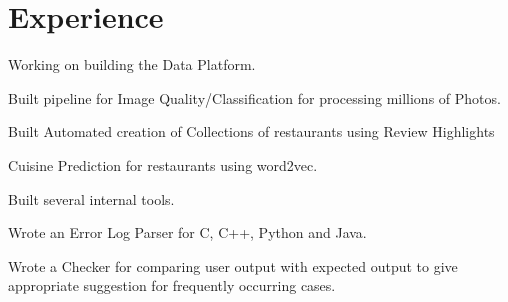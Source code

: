 \documentclass[]{deedy-resume-openfont}
\begin{document}
\begin{minipage}[t]{0.66\textwidth} 


\section{Experience}



\vspace{\topsep} %
\begin{tightemize}

\item Working on building the Data Platform.
\end{tightemize}
\sectionsep

\vspace{\topsep} %
\begin{tightemize}
\item Built pipeline for Image Quality/Classification for processing millions of Photos.
\item Built Automated creation of Collections of restaurants using Review Highlights
\item Cuisine Prediction for restaurants using word2vec.
\item Built several internal tools.
\end{tightemize}
\sectionsep


\vspace{\topsep} %
\begin{tightemize}
\item Wrote an Error Log Parser for C, C++, Python and Java.
\item Wrote a Checker for comparing user output with expected output to give appropriate suggestion for frequently occurring cases. 
\end{tightemize}
\sectionsep


\end{minipage}
\end{document}
